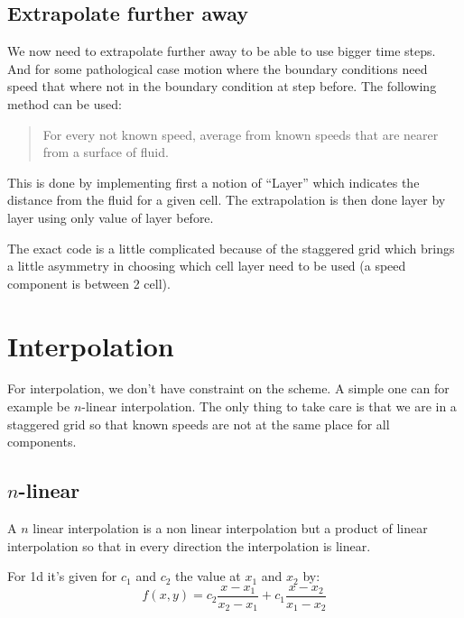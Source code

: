 \subsection{Extrapolate further away}

We now need to extrapolate further away to be able to use bigger time steps.
And for some pathological case motion where the boundary conditions need speed that  where not in the boundary condition at step before.
The following method can be used:
\begin{quote}
For every not known speed, average from known speeds that are nearer from a surface of fluid.
\end{quote}
This is done by implementing first a notion of ``Layer'' which indicates the distance from the fluid for a given cell.
The extrapolation is then done layer by layer using only value of layer before.

The exact code is a little complicated because of the staggered grid which brings a little asymmetry in choosing which cell layer need to be used
(a speed component is between 2 cell).


\section{Interpolation}

For interpolation, we don't have constraint on the scheme. A simple one can for example be $n$-linear interpolation.
The only thing to take care is that we are in a staggered grid so that known speeds are not at the same place
for all components.

\subsection{$n$-linear}

A $n$ linear interpolation is a non linear interpolation but a product of linear interpolation so that in every direction the interpolation is linear.

For 1d it's given for $c_1$ and $c_2$ the value at $x_1$ and $x_2$ by:
\begin{equation}
	f(x,y)=c_2\frac{x-x_{1}}{x_{2}-x_{1}}+c_1\frac{x-x_{2}}{x_{1}-x_{2}}
\end{equation}

